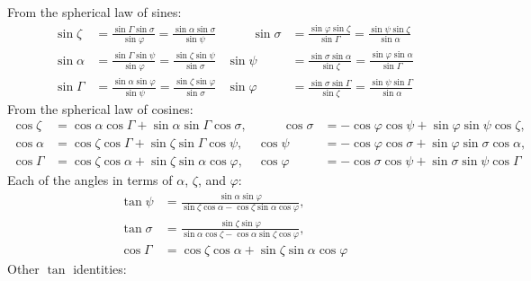 \documentclass{book}
\newcommand{\phase}{\varphi}
\begin{document}
From the spherical law of sines:
\begin{equation}
    \begin{aligned}
    \sin\zeta  &= \frac{\sin\Gamma \sin\sigma}{\sin\phase}
                = \frac{\sin\alpha \sin\sigma}{\sin\psi} &\qquad
    \sin\sigma &= \frac{\sin\phase \sin\zeta}{\sin\Gamma}
                = \frac{\sin\psi \sin\zeta}{\sin\alpha} \\
    \sin\alpha &= \frac{\sin\Gamma \sin\psi}{\sin\phase}
                = \frac{\sin\zeta \sin\psi}{\sin\sigma} &
    \sin\psi   &= \frac{\sin\sigma\sin\alpha}{\sin\zeta}
                = \frac{\sin\phase \sin\alpha}{\sin\Gamma} \\
    \sin\Gamma &= \frac{\sin\alpha \sin\phase}{\sin\psi}
                = \frac{\sin\zeta \sin\phase}{\sin\sigma} &
    \sin\phase &= \frac{\sin\sigma \sin\Gamma}{\sin\zeta}
                = \frac{\sin\psi \sin\Gamma}{\sin\alpha}
    \end{aligned}
\end{equation}
From the spherical law of cosines:
\begin{equation}
    \begin{aligned}
        \cos\zeta  &=  \cos\alpha \cos\Gamma + \sin\alpha \sin\Gamma \cos\sigma, &\qquad
        \cos\sigma &= -\cos\phase \cos\psi   + \sin\phase \sin\psi   \cos\zeta,  \\[5pt]
        \cos\alpha &=  \cos\zeta  \cos\Gamma + \sin\zeta  \sin\Gamma \cos\psi,   &
        \cos\psi   &= -\cos\phase \cos\sigma + \sin\phase \sin\sigma \cos\alpha, \\[5pt]
        \cos\Gamma &=  \cos\zeta  \cos\alpha + \sin\zeta  \sin\alpha \cos\phase, &
        \cos\phase &= -\cos\sigma \cos\psi   + \sin\sigma \sin\psi   \cos\Gamma
    \end{aligned}
\end{equation}
Each of the angles in terms of $\alpha$, $\zeta$, and $\phase$:
\begin{equation}
    \begin{aligned}
        \tan\psi   &= \frac{\sin\alpha \sin\phase}{\sin\zeta \cos\alpha - \cos\zeta \sin\alpha \cos\phase}, \\[5pt]
        \tan\sigma &= \frac{\sin\zeta  \sin\phase}{\sin\alpha \cos\zeta - \cos\alpha \sin\zeta \cos\phase}, \\[10pt]
        \cos\Gamma &= \cos\zeta  \cos\alpha + \sin\zeta  \sin\alpha \cos\phase
    \end{aligned}
\end{equation}
Other $\tan$ identities:
\end{document}
